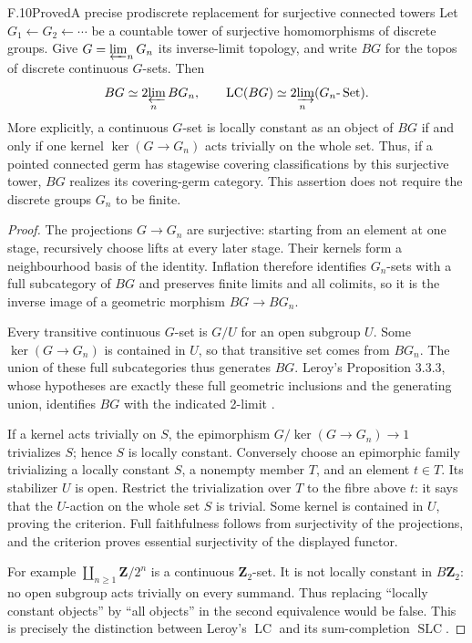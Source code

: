 \begin{statement}{F.10}{Proved}{A precise prodiscrete replacement for surjective connected towers}
Let $G_1\leftarrow G_2\leftarrow\cdots$ be a countable tower of
surjective homomorphisms of discrete groups. Give
$G=\varprojlim_nG_n$ its inverse-limit topology, and write $BG$ for
the topos of discrete continuous $G$-sets. Then
\[
 BG\simeq\operatorname*{2\!\varprojlim}_n BG_n,
 \qquad
 \operatorname{LC}(BG)\simeq
       \operatorname*{2\!\varinjlim}_n(G_n\text{-}\operatorname{Set}).
\]
More explicitly, a continuous $G$-set is locally constant as an
object of $BG$ if and only if one kernel
$\ker(G\to G_n)$ acts trivially on the whole set. Thus, if a
pointed connected germ has stagewise covering classifications by this
surjective tower, $BG$ realizes its covering-germ category. This
assertion does not require the discrete groups $G_n$ to be finite.
\end{statement}
\begin{proof}
The projections $G\to G_n$ are surjective: starting from an element
at one stage, recursively choose lifts at every later stage.
Their kernels form a neighbourhood basis of the identity. Inflation
therefore identifies $G_n$-sets with a full subcategory of $BG$ and
preserves finite limits and all colimits, so it is the inverse image
of a geometric morphism $BG\to BG_n$.

Every transitive continuous $G$-set is $G/U$ for an open subgroup
$U$. Some $\ker(G\to G_n)$ is contained in $U$, so that transitive
set comes from $BG_n$. The union of these full subcategories thus
generates $BG$. Leroy's Proposition 3.3.3, whose hypotheses are
exactly these full geometric inclusions and the generating union,
identifies $BG$ with the indicated 2-limit \cite{fghLeroy}.

If a kernel acts trivially on $S$, the epimorphism
$G/\ker(G\to G_n)\to1$ trivializes $S$; hence $S$ is locally
constant. Conversely choose an epimorphic family trivializing a
locally constant $S$, a nonempty member $T$, and an element $t\in T$.
Its stabilizer $U$ is open. Restrict the trivialization over $T$ to
the fibre above $t$: it says that the $U$-action on the whole set $S$
is trivial. Some kernel is contained in $U$, proving the criterion.
Full faithfulness follows from surjectivity of the projections, and
the criterion proves essential surjectivity of the displayed functor.

For example $\coprod_{n\geq1}\mathbf Z/2^n$ is a continuous
$\mathbf Z_2$-set. It is not locally constant in $B\mathbf Z_2$:
no open subgroup acts trivially on every summand. Thus replacing
``locally constant objects'' by ``all objects'' in the second
equivalence would be false. This is precisely the distinction between
Leroy's $\operatorname{LC}$ and its sum-completion
$\operatorname{SLC}$.
\end{proof}

